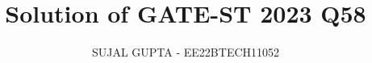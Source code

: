 \documentclass[journal,12pt,onecolumn]{IEEEtran}
\theoremstyle{remark}
\begin{document}
%




\vspace{3cm}

\title{
Solution of GATE-ST 2023 Q58
}
\author{ SUJAL GUPTA - EE22BTECH11052
}	


%
%
%

% 
%



% 
\end{document}
